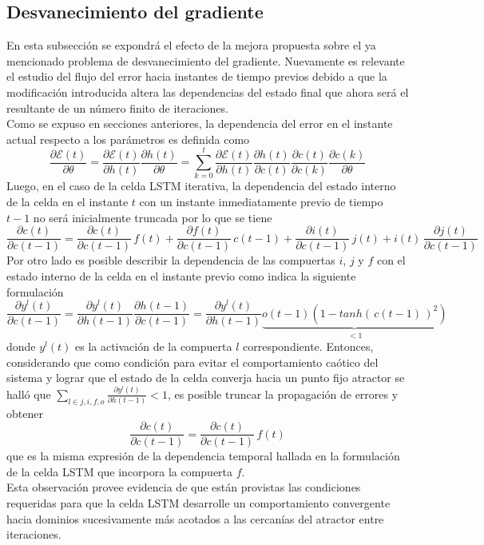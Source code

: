 \documentclass{article}
\begin{document}
	\subsection{Desvanecimiento del gradiente}
	En esta subsección se expondrá el efecto de la mejora propuesta sobre el ya mencionado problema de desvanecimiento del gradiente. Nuevamente es relevante el estudio del flujo del error hacia instantes de tiempo previos debido a que la modificación introducida altera las dependencias del estado final que ahora será el resultante de un número finito de iteraciones.\\
	Como se expuso en secciones anteriores, la dependencia del error en el instante actual respecto a los parámetros es definida como
	\begin{equation*}
	\dfrac{\partial \mathcal{E}(t)}{\partial \theta} = \dfrac{\partial \mathcal{E}(t)}{\partial h(t)} \dfrac{\partial h(t)}{\partial \theta} =\sum_{k=0}^{t} \dfrac{\partial \mathcal{E}(t)}{\partial h(t)} \dfrac{\partial h(t)}{\partial c(t)}\dfrac{\partial c(t)}{\partial c(k)}\dfrac{\partial c(k)}{\partial \theta}
	\end{equation*}
	Luego, en el caso de la celda LSTM iterativa, la dependencia del estado interno de la celda en el instante $t$ con un instante inmediatamente previo de tiempo $t-1$ no será inicialmente truncada por lo que se tiene
	\begin{equation*}\label{expandedIterativeLSTMCEC}
	\dfrac{\partial c(t)}{\partial c(t-1)} =  \dfrac{\partial c(t)}{\partial c(t-1)} \,  f(t) + \dfrac{\partial f(t)}{\partial c(t-1)} \, c(t-1) + \dfrac{\partial i(t)}{\partial c(t-1)} \, j(t) + i(t) \, \dfrac{\partial j(t)}{\partial c(t-1)} 
	\end{equation*}
	Por otro lado es posible describir la dependencia de las compuertas $i$, $j$ y $f$ con el estado interno de la celda en el instante previo como indica la siguiente formulación
	\begin{equation*}
	\dfrac{\partial y^l(t)}{\partial c(t-1)} =  \dfrac{\partial y^l(t)}{\partial h(t-1)} \dfrac{\partial h(t-1)}{\partial c(t-1)} = \dfrac{\partial y^l(t)}{\partial h(t-1)} \underbrace{o(t-1)(1- tanh( \,c(t-1) \,)^2)}_{<1}
	\end{equation*}
	donde $y^l(t)$ es la activación de la compuerta $l$ correspondiente. Entonces, considerando que como condición para evitar el comportamiento caótico del sistema y lograr que el estado de la celda converja hacia un punto fijo atractor se halló que $\sum_{l \in {j,i,f,o}} \frac{\partial y^l(t)}{\partial h(t-1)} < 1$, es posible truncar la propagación de errores y obtener
	\begin{equation*}
	\dfrac{\partial c(t)}{\partial c(t-1)} =  \dfrac{\partial c(t)}{\partial c(t-1)} \, f(t)
	\end{equation*}
	que es la misma expresión de la dependencia temporal hallada en la formulación de la celda LSTM que incorpora la compuerta $f$.\\
	Esta observación provee evidencia de que están provistas las condiciones requeridas para que la celda LSTM desarrolle un comportamiento convergente hacia dominios sucesivamente más acotados a las cercanías del atractor entre iteraciones.\\
	
\end{document}
